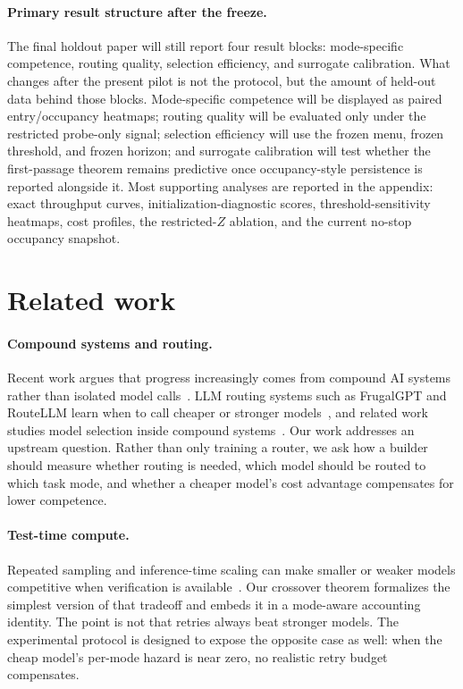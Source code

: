 \documentclass{article}
\begin{document}
\paragraph{Primary result structure after the freeze.}
The final holdout paper will still report four result blocks: mode-specific competence, routing quality, selection efficiency, and surrogate calibration.
What changes after the present pilot is not the protocol, but the amount of held-out data behind those blocks.
Mode-specific competence will be displayed as paired entry/occupancy heatmaps; routing quality will be evaluated only under the restricted probe-only signal; selection efficiency will use the frozen menu, frozen threshold, and frozen horizon; and surrogate calibration will test whether the first-passage theorem remains predictive once occupancy-style persistence is reported alongside it.
Most supporting analyses are reported in the appendix: exact throughput curves, initialization-diagnostic scores, threshold-sensitivity heatmaps, cost profiles, the restricted-$Z$ ablation, and the current no-stop occupancy snapshot.

\section{Related work}
\label{sec:related}

\paragraph{Compound systems and routing.}
Recent work argues that progress increasingly comes from compound AI systems rather than isolated model calls~\citep{zaharia2024compound}.
LLM routing systems such as FrugalGPT and RouteLLM learn when to call cheaper or stronger models~\citep{chen2023frugalgpt,ong2024routellm}, and related work studies model selection inside compound systems~\citep{chen2025optimizing}.
Our work addresses an upstream question.
Rather than only training a router, we ask how a builder should measure whether routing is needed, which model should be routed to which task mode, and whether a cheaper model's cost advantage compensates for lower competence.

\paragraph{Test-time compute.}
Repeated sampling and inference-time scaling can make smaller or weaker models competitive when verification is available~\citep{brown2024monkeys,snell2025testtime,wu2025inference,osca2024}.
Our crossover theorem formalizes the simplest version of that tradeoff and embeds it in a mode-aware accounting identity.
The point is not that retries always beat stronger models.
The experimental protocol is designed to expose the opposite case as well: when the cheap model's per-mode hazard is near zero, no realistic retry budget compensates.
\end{document}
